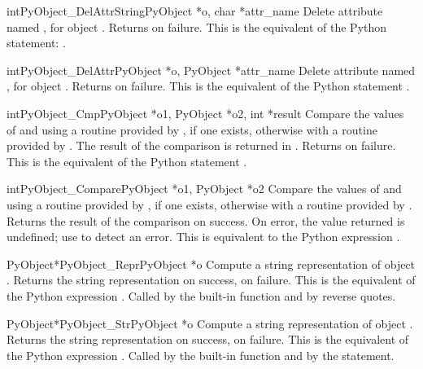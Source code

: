 \documentclass{manual}
\begin{document}
\begin{cfuncdesc}{int}{PyObject_DelAttrString}{PyObject *o, char *attr_name}
Delete attribute named , for object . Returns
 on failure.  This is the equivalent of the Python
statement: .
\end{cfuncdesc}


\begin{cfuncdesc}{int}{PyObject_DelAttr}{PyObject *o, PyObject *attr_name}
Delete attribute named , for object . Returns
 on failure.  This is the equivalent of the Python
statement .
\end{cfuncdesc}


\begin{cfuncdesc}{int}{PyObject_Cmp}{PyObject *o1, PyObject *o2, int *result}
Compare the values of  and  using a routine provided
by , if one exists, otherwise with a routine provided by
.  The result of the comparison is returned in .
Returns  on failure.  This is the equivalent of the Python
statement .
\end{cfuncdesc}


\begin{cfuncdesc}{int}{PyObject_Compare}{PyObject *o1, PyObject *o2}
Compare the values of  and  using a routine provided
by , if one exists, otherwise with a routine provided by
.  Returns the result of the comparison on success.  On error,
the value returned is undefined; use  to
detect an error.  This is equivalent to the Python
expression .
\end{cfuncdesc}


\begin{cfuncdesc}{PyObject*}{PyObject_Repr}{PyObject *o}
Compute a string representation of object .  Returns the
string representation on success, \NULL{} on failure.  This is
the equivalent of the Python expression .
Called by the  built-in function
and by reverse quotes.
\end{cfuncdesc}


\begin{cfuncdesc}{PyObject*}{PyObject_Str}{PyObject *o}
Compute a string representation of object .  Returns the
string representation on success, \NULL{} on failure.  This is
the equivalent of the Python expression .
Called by the  built-in function and
by the  statement.
\end{cfuncdesc}
\end{document}
